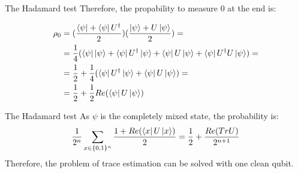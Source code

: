 \documentclass[leqno,fleqn]{beamer}
\begin{document}
\begin{frame}[label=sec-1-10]{The Hadamard test}
Therefore, the propability to measure 0 at the end is:

\begin{align*}
\rho_{0} &= (\frac{\left\langle{\psi}\right\vert + \left\langle{\psi}\right\vert U^\dagger}{2})(\frac{\left\vert{\psi}\right\rangle + U\left\vert{\psi}\right\rangle}{2}) = \\
    &= \frac{1}{4}(\left\langle{\psi}\right\vert\left\vert{\psi}\right\rangle + \left\langle{\psi}\right\vert U^\dagger\left\vert{\psi}\right\rangle + \left\langle{\psi}\right\vert U\left\vert{\psi}\right\rangle + \left\langle{\psi}\right\vert U^\dagger U\left\vert{\psi}\right\rangle) = \\
    &= \frac{1}{2} + \frac{1}{4}(\left\langle{\psi}\right\vert U^\dagger\left\vert{\psi}\right\rangle + \left\langle{\psi}\right\vert U\left\vert{\psi}\right\rangle) = \\
    &=  \frac{1}{2} + \frac{1}{2}Re(\left\langle{\psi}\right\vert U\left\vert{\psi}\right\rangle)
\end{align*}
\end{frame}
\begin{frame}[label=sec-1-11]{The Hadamard test}
As \(\psi\) is the completely mixed state, the probability is: \\
\begin{align*}
  \frac{1}{2^{n}}\sum_{x \in \{0,1\}^n}{\frac{1+Re(\left\langle{x}\right\vert U\left\vert{x}\right\rangle)}{2}} = \frac{1}{2} + \frac{Re(TrU)}{2^{n+1}}
\end{align*}
Therefore, the problem of trace estimation can be solved with one clean qubit.
\end{frame}
\end{document}

